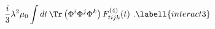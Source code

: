 \begin{equation}
{i\over3}\lambda^2\mu_0\int dt\,\Tr\left(\Phi^i\Phi^j\Phi^k\right)
F^{(4)}_{tijk}(t)\ .
\labell{interact3}
\end{equation}

